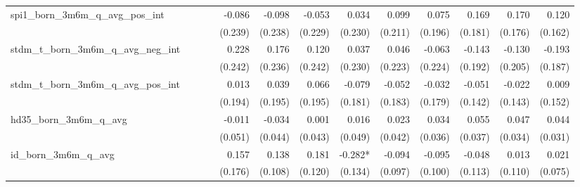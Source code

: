 \begin{tabular}{lrrrrrrrrrrrr}
spi1\_born\_3m6m\_q\_avg\_pos\_int          &              &              &              &       -0.086 &       -0.098 &       -0.053 &        0.034 &        0.099 &        0.075 &        0.169 &        0.170 &        0.120 \\ 
                                            &              &              &              &      (0.239) &      (0.238) &      (0.229) &      (0.230) &      (0.211) &      (0.196) &      (0.181) &      (0.176) &      (0.162) \\ 
stdm\_t\_born\_3m6m\_q\_avg\_neg\_int       &              &              &              &        0.228 &        0.176 &        0.120 &        0.037 &        0.046 &       -0.063 &       -0.143 &       -0.130 &       -0.193 \\ 
                                            &              &              &              &      (0.242) &      (0.236) &      (0.242) &      (0.230) &      (0.223) &      (0.224) &      (0.192) &      (0.205) &      (0.187) \\ 
stdm\_t\_born\_3m6m\_q\_avg\_pos\_int       &              &              &              &        0.013 &        0.039 &        0.066 &       -0.079 &       -0.052 &       -0.032 &       -0.051 &       -0.022 &        0.009 \\ 
                                            &              &              &              &      (0.194) &      (0.195) &      (0.195) &      (0.181) &      (0.183) &      (0.179) &      (0.142) &      (0.143) &      (0.152) \\ 
hd35\_born\_3m6m\_q\_avg                    &              &              &              &       -0.011 &       -0.034 &        0.001 &        0.016 &        0.023 &        0.034 &        0.055 &        0.047 &        0.044 \\ 
                                            &              &              &              &      (0.051) &      (0.044) &      (0.043) &      (0.049) &      (0.042) &      (0.036) &      (0.037) &      (0.034) &      (0.031) \\ 
id\_born\_3m6m\_q\_avg                      &              &              &              &        0.157 &        0.138 &        0.181 &      -0.282* &       -0.094 &       -0.095 &       -0.048 &        0.013 &        0.021 \\ 
                                            &              &              &              &      (0.176) &      (0.108) &      (0.120) &      (0.134) &      (0.097) &      (0.100) &      (0.113) &      (0.110) &      (0.075) \\ 

\end{tabular}

